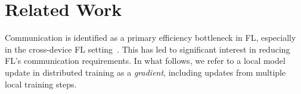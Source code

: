 \documentclass[11pt]{article}
\begin{document}








\newcommand{\para}[1]{\noindent \textbf{#1}}

\section{Related Work}
\label{sec:related}

Communication is identified as a primary efficiency bottleneck in FL, especially in the cross-device FL setting~\cite{Graham-kairouz2019advances}.
This has led to significant interest in reducing FL's communication requirements. In what follows, we refer to a local model update in distributed training as a \emph{gradient}, including updates from multiple local training steps.
\end{document}
